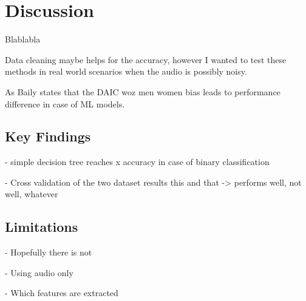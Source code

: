 \section{Discussion}

Blablabla

Data cleaning maybe helps for the accuracy, however I wanted to test these methods in real world scenarios when the audio is possibly noisy. 

As Baily\cite{bailey2021gender} states that the DAIC woz men women bias leads to performance difference in case of ML models. 

\subsection{Key Findings}
- simple decision tree reaches x accuracy in case of binary classification

- Cross validation of the two dataset results this and that -> performs well, not well, whatever
\subsection{Limitations}
- Hopefully there is not

- Using audio only

- Which features are extracted